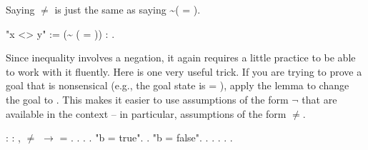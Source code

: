 \documentclass[12pt]{report}
\begin{document}
 Saying  \ensuremath{\not=}  is just the same as saying \~{}( = ). \begin{coqdoccode}
\coqdocemptyline
\coqdocnoindent
{} "x <> y" := (\~{} ( = )) : .\coqdoceol
\coqdocemptyline
\end{coqdoccode}
Since inequality involves a negation, it again requires
    a little practice to be able to work with it fluently.  Here
    is one very useful trick.  If you are trying to prove a goal
    that is nonsensical (e.g., the goal state is  = ),
    apply the lemma  to change the goal to
    .  This makes it easier to use assumptions of the form
    \ensuremath{\lnot} that are available in the context -- in particular,
    assumptions of the form \ensuremath{\not=}. \begin{coqdoccode}
\coqdocemptyline
\coqdocnoindent
{}  : \coqdockw{\ensuremath{\forall}}  : ,\coqdoceol
\coqdocindent{1.00em}
 \ensuremath{\not=}  \ensuremath{\rightarrow}  = .\coqdoceol
\coqdocnoindent
{}.\coqdoceol
\coqdocindent{1.00em}
  .  .\coqdoceol
\coqdocindent{1.00em}
 "b = true". .\coqdoceol
\coqdocindent{1.00em}
 "b = false".\coqdoceol
\coqdocindent{2.00em}
   .\coqdoceol
\coqdocindent{2.00em}
 .\coqdoceol
\coqdocindent{2.00em}
 . . .\coqdoceol
\coqdocemptyline
\end{coqdoccode}
\subsubsection{ }



\subsubsection{ }



\subsubsection{ }
\end{document}
